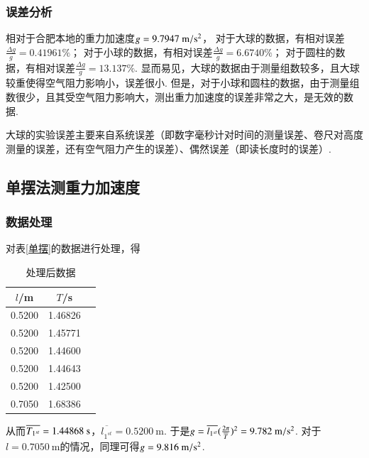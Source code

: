 \documentclass[a4paper]{article}%
\begin{document}
\subsubsection{误差分析}
相对于合肥本地的重力加速度$g=9.7947~\text m/\text s^2$，
对于大球的数据，有相对误差$\frac{\Delta g}{g}=0.41961\%$；
对于小球的数据，有相对误差$\frac{\Delta g}{g}=6.6740\%$；
对于圆柱的数据，有相对误差$\frac{\Delta g}{g}=13.137\%$.
显而易见，大球的数据由于测量组数较多，且大球较重使得空气阻力影响小，误差很小.
但是，对于小球和圆柱的数据，由于测量组数很少，且其受空气阻力影响大，测出重力加速度的误差非常之大，是无效的数据.

大球的实验误差主要来自系统误差（即数字毫秒计对时间的测量误差、卷尺对高度测量的误差，还有空气阻力产生的误差）、偶然误差（即读长度时的误差）.

\subsection{单摆法测重力加速度}
\subsubsection{数据处理}
对表\ref{单摆}的数据进行处理，得
\begin{table}[H]
    \begin{center}
        \begin{tabular}{ccc}
            \toprule
            $l$/m & $T$/s\\
            \midrule
            0.5200 & 1.46826 \\
            0.5200 & 1.45771 \\
            0.5200 & 1.44600 \\
            0.5200 & 1.44643 \\
            0.5200 & 1.42500 \\
            0.7050 & 1.68386 \\
            \bottomrule
        \end{tabular}
        \caption{处理后数据}
    \end{center}
\end{table}
从而$\overline{T_{1^{st}}}=1.44868~\text s$，$\overline{l_{1^{st}}}=0.5200~$m.
于是$g=\overline{l_{1^{st}}}(\frac{2\pi}{\overline{T}})^2=9.782~\text m/\text s^2$.
对于$l=0.7050~$m的情况，同理可得$g=9.816~\text m/\text s^2$.
\end{document}
